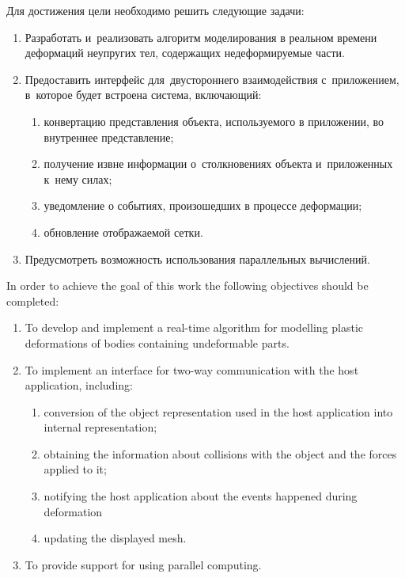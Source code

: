 \documentclass[a4paper, 12pt, titlepage]{extarticle}
\begin{document}
\begin{original}
    Для достижения цели необходимо решить следующие задачи:
    \begin{enumerate}
      \item Разработать и~реализовать алгоритм моделирования в реальном времени деформаций
        не\-у\-пру\-гих тел, содержащих недеформируемые части.
      \item Предоставить интерфейс для~двустороннего взаимодействия с~приложением, в~которое будет
        встроена система, включающий:
        \begin{enumerate}
          \item конвертацию представления объекта, используемого в приложении, во внутреннее представление;
          \item получение извне информации о~столкновениях объекта и~приложенных к~нему силах;
          \item уведомление о событиях, произошедших в процессе деформации;
          \item обновление отображаемой сетки.
        \end{enumerate}
      \item Предусмотреть возможность использования параллельных вычислений.
    \end{enumerate}
\end{original}

    In order to achieve the goal of this work the following objectives should be completed:
    \begin{enumerate}
      \item To develop and implement a real-time algorithm for modelling plastic deformations of bodies
        containing undeformable parts.
      \item To implement an interface for two-way communication with the host application, including:
        \begin{enumerate}
          \item conversion of the object representation used in the host application into internal representation;
          \item obtaining the information about collisions with the object and the forces applied to it;
          \item notifying the host application about the events happened during deformation
          \item updating the displayed mesh.
        \end{enumerate}
      \item To provide support for using parallel computing.
    \end{enumerate}
\end{document}
